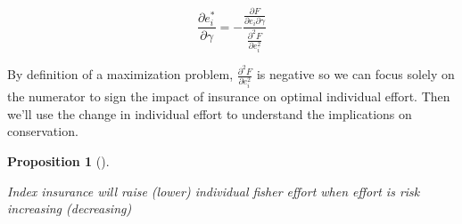 \documentclass[
  super,
  preprint,
  3p]{elsarticle}
\theoremstyle{plain}
\newtheorem{proposition}{Proposition}[section]
\theoremstyle{plain}
\theoremstyle{remark}
\begin{document}
\[
\frac{\partial e_i^*}{\partial \gamma}=-\frac{\frac{\partial F}{\partial e_i \partial \gamma}}{\frac{\partial^2 F}{\partial e_i^2}}
\]

By definition of a maximization problem,
\(\frac{\partial^2 F}{\partial e_i^2}\) is negative so we can focus
solely on the numerator to sign the impact of insurance on optimal
individual effort. Then we'll use the change in individual effort to
understand the implications on conservation.

\begin{proposition}[]\protect\hypertarget{prp-cp}{}\label{prp-cp}

Index insurance will raise (lower) individual fisher effort when effort
is risk increasing (decreasing)

\end{proposition}
\end{document}
